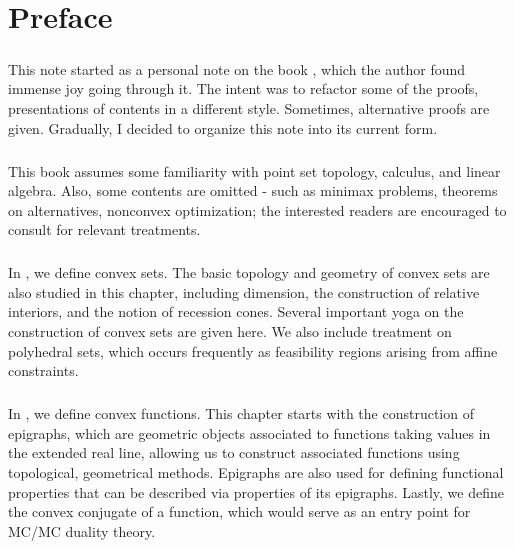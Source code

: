 \chapter*{Preface}

\paragraph{}This note started as a personal note on the book \cite{bertsekas2009convex}, which the author found immense joy going through it. The intent was to refactor some of the proofs, presentations of contents in a different style. Sometimes, alternative proofs are given. Gradually, I decided to organize this note into its current form.

\paragraph{}This book assumes some familiarity with point set topology, calculus, and linear algebra. Also, some contents are omitted - such as minimax problems, theorems on alternatives, nonconvex optimization; the interested readers are encouraged to consult \cite{bertsekas2009convex} for relevant treatments.

\paragraph{}In , we define convex sets. The basic topology and geometry of convex sets are also studied in this chapter, including dimension, the construction of relative interiors, and the notion of recession cones. Several important yoga on the construction of convex sets are given here. We also include treatment on polyhedral sets, which occurs frequently as feasibility regions arising from affine constraints.

\paragraph{}In , we define convex functions. This chapter starts with the construction of epigraphs, which are geometric objects associated to functions taking values in the extended real line, allowing us to construct associated functions using topological, geometrical methods. Epigraphs are also used for defining functional properties that can be described via properties of its epigraphs. Lastly, we define the convex conjugate of a function, which would serve as an entry point for MC/MC duality theory.

